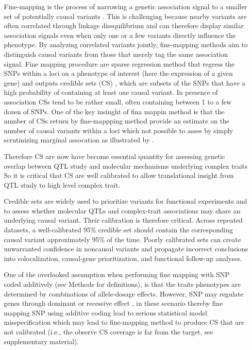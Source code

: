\documentclass[12pt]{article}
\begin{document}
Fine-mapping is the process of narrowing a genetic association signal
to a smaller set of potentially causal variants
\cite{schaid_genome-wide_2018}. This is challenging because nearby
variants are often correlated through linkage disequilibrium and can
therefore display similar association signals even when only one or a
few variants directly influence the phenotype. By analyzing correlated
variants jointly, fine-mapping methods aim to distinguish causal
variants from those that merely tag the same association signal.  Fine mapping procedure are sparse regression method that  regress the SNPs within a loci on a phenotype of interest (here the expression of a given gene) and outputs credible sets (CS) \cite{maller_bayesian_2012}, which are subsets of the SNPs that have a high probability of containing at least one causal variant. In presence of association CSs tend to be rather small, often  containing between 1 to a few dozen of SNPs. One of the key insinght of fina mappin method is that the number of CSs return by fine-mappping method provide an estimate on the number of  causal variants within a loci which  not possible to asses by simply scrutinizing marginal assocation as illustrated by \cite{wang_simple_2020}.

Therefore CS are now have become essential quantity for assessing genetic overlap between QTL study and molecular mechanisms underlying complex traits  So it is critical that CS are well calibrated to allow translational insight from QTL study to high level complex trait.

Credible sets are widely used to prioritize variants for functional
experiments and to assess whether molecular QTLs and complex-trait
associations may share an underlying causal variant. Their calibration
is therefore critical. Across repeated datasets, a well-calibrated
95\% credible set should contain the corresponding causal variant
approximately 95\% of the time. Poorly calibrated sets can create
unwarranted confidence in noncausal variants and propagate incorrect
conclusions into colocalization, causal-gene prioritization, and
functional follow-up analyses.







One of the overlooked  assumption when performing fine mapping with SNP coded additively (see Methods for definitions), is that the traits   phenotypes are determined by combinations of allele-dosage effects. However, SNP may regulate genes through dominant  or recessive effect \cite{cui_dominance_2023,palmer_analysis_2023}, in these scenario thereby fine mapping SNP using additive coding lead to serious statistical model misspecification which may lead to fine-mapping method to produce CS that are not calibrated (i.e., the observe CS coverage is far from the target, see supplementary material). 
\end{document}
